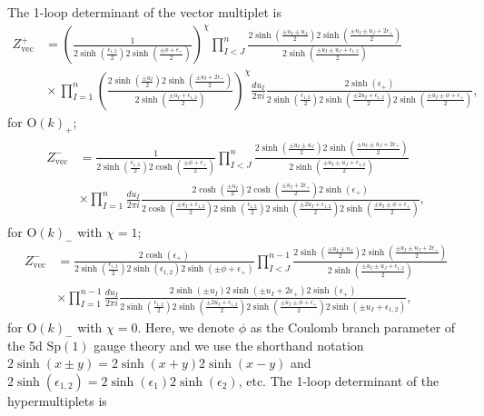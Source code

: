 \documentclass[11pt, a4paper]{article}
\theoremstyle{definition}
\begin{document}
The 1-loop determinant of the vector multiplet is
\begin{align}
    Z_{\mathrm{vec}}^+ &= \left( \frac{1}{2\sinh(\frac{\epsilon_{1,2}}{2}) 2\sinh(\frac{\pm \phi + \epsilon_+}{2})} \right)^\chi \prod_{I<J}^n \frac{2\sinh(\frac{\pm u_I \pm u_J}{2}) 2\sinh(\frac{\pm u_I \pm u_J + 2\epsilon_+}{2})}{2\sinh(\frac{\pm u_I \pm u_J + \epsilon_{1,2}}{2})} \\
    &\!\!\!\!\!\! \times \prod_{I=1}^n \left( \frac{2\sinh(\frac{\pm u_I}{2}) 2\sinh( \frac{\pm u_I + 2\epsilon_+}{2})}{2\sinh(\frac{\pm u_I + \epsilon_{1,2}}{2})} \right)^\chi  \frac{du_I}{2\pi i} \frac{2\sinh(\epsilon_+)}{2\sinh(\frac{\epsilon_{1,2}}{2}) 2\sinh(\frac{\pm 2u_I + \epsilon_{1,2}}{2}) 2\sinh(\frac{\pm u_I \pm \phi + \epsilon_+}{2})}, \nonumber
\end{align}
for $ \mathrm{O}(k)_+ $;
\begin{align}
    \begin{aligned}
        Z_{\mathrm{vec}}^- &= \frac{1}{2\sinh(\frac{\epsilon_{1,2}}{2}) 2\cosh(\frac{\pm \phi + \epsilon_+}{2})} \prod_{I<J}^n \frac{2\sinh(\frac{\pm u_I \pm u_J}{2}) 2\sinh(\frac{\pm u_I \pm u_J + 2\epsilon_+}{2})}{2\sinh(\frac{\pm u_I \pm u_J + \epsilon_{1,2}}{2})} \\
        &\times \prod_{I=1}^n \frac{du_I}{2\pi i} \frac{2\cosh(\frac{\pm u_I}{2}) 2\cosh(\frac{\pm u_I+2\epsilon_+}{2}) 2\sinh(\epsilon_+)}{2\cosh(\frac{\pm u_I+\epsilon_{1,2}}{2}) 2\sinh(\frac{\epsilon_{1,2}}{2}) 2\sinh(\frac{\pm 2u_I + \epsilon_{1,2}}{2}) 2\sinh(\frac{\pm u_I \pm \phi + \epsilon_+}{2})} ,
    \end{aligned}
\end{align}
for $ \mathrm{O}(k)_- $ with $ \chi=1 $;
\begin{align}
    Z_{\mathrm{vec}}^- &= \frac{2\cosh(\epsilon_+)}{2\sinh(\frac{\epsilon_{1,2}}{2}) 2\sinh(\epsilon_{1,2}) 2\sinh(\pm \phi + \epsilon_+)} \prod_{I<J}^{n-1} \frac{2\sinh(\frac{\pm u_I \pm u_J}{2}) 2\sinh(\frac{\pm u_I \pm u_J + 2\epsilon_+}{2})}{2\sinh(\frac{\pm u_I \pm u_J + \epsilon_{1,2}}{2})} \nonumber \\
    &\times \prod_{I=1}^{n-1} \frac{du_I}{2\pi i} \frac{2\sinh(\pm u_I) 2\sinh(\pm u_I + 2\epsilon_+) 2\sinh(\epsilon_+)}{2\sinh(\frac{\epsilon_{1,2}}{2}) 2\sinh(\frac{\pm 2u_I + \epsilon_{1,2}}{2}) 2\sinh(\frac{\pm u_I \pm \phi + \epsilon_+}{2}) 2\sinh(\pm u_I + \epsilon_{1,2})} ,
\end{align}
for $ \mathrm{O}(k)_- $ with $ \chi=0 $. Here, we denote $ \phi $ as the Coulomb branch parameter of the 5d $ \mathrm{Sp}(1) $ gauge theory and we use the shorthand notation $ 2\sinh(x \pm y) = 2\sinh(x+y) 2\sinh(x-y) $ and $ 2\sinh(\epsilon_{1,2}) = 2\sinh(\epsilon_1) 2\sinh(\epsilon_2) $, etc. The 1-loop determinant of the hypermultiplets is
\end{document}
